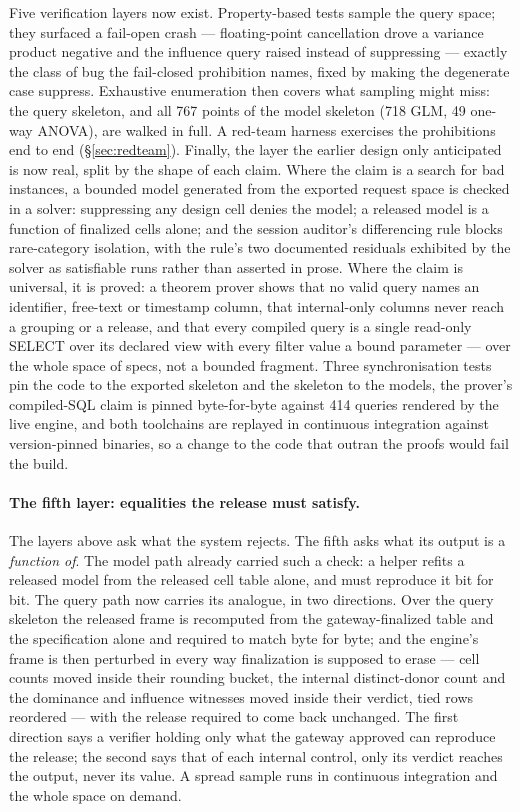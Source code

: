 \documentclass[11pt,a4paper]{article}
\begin{document}
Five verification layers now exist. Property-based tests sample the query
space; they surfaced a fail-open crash --- floating-point cancellation drove a
variance product negative and the influence query raised instead of suppressing
--- exactly the class of bug the fail-closed prohibition names, fixed by making
the degenerate case suppress. Exhaustive enumeration then covers what sampling
might miss: the query skeleton, and all 767 points of the model skeleton (718
GLM, 49 one-way ANOVA), are walked in full. A red-team harness exercises the
prohibitions end to end (\S\ref{sec:redteam}). Finally, the layer the earlier
design only anticipated is now real, split by the shape of each claim. Where
the claim is a search for bad instances, a bounded model generated from the
exported request space is checked in a solver: suppressing any design cell
denies the model; a released model is a function of finalized cells alone; and
the session auditor's differencing rule blocks rare-category isolation, with
the rule's two documented residuals exhibited by the solver as satisfiable
runs rather than asserted in prose. Where the claim is universal, it is
proved: a theorem prover shows that no valid query names an identifier,
free-text or timestamp column, that internal-only columns never reach a
grouping or a release, and that every compiled query is a single read-only
SELECT over its declared view with every filter value a bound parameter ---
over the whole space of specs, not a bounded fragment. Three synchronisation
tests pin the code to the exported skeleton and the skeleton to the models,
the prover's compiled-SQL claim is pinned byte-for-byte against 414 queries
rendered by the live engine, and both toolchains are replayed in continuous
integration against version-pinned binaries, so a change to the code that
outran the proofs would fail the build.

\paragraph{The fifth layer: equalities the release must satisfy.}
The layers above ask what the system rejects. The fifth asks what its output
is a \emph{function of}. The model path already carried such a check: a helper
refits a released model from the released cell table alone, and must reproduce
it bit for bit. The query path now carries its analogue, in two directions.
Over the query skeleton the released frame is recomputed from the
gateway-finalized table and the specification alone and required to match byte
for byte; and the engine's frame is then perturbed in every way finalization
is supposed to erase --- cell counts moved inside their rounding bucket, the
internal distinct-donor count and the dominance and influence witnesses moved
inside their verdict, tied rows reordered --- with the release required to
come back unchanged. The first direction says a verifier holding only what the
gateway approved can reproduce the release; the second says that of each
internal control, only its verdict reaches the output, never its value. A
spread sample runs in continuous integration and the whole space on demand.
\end{document}
